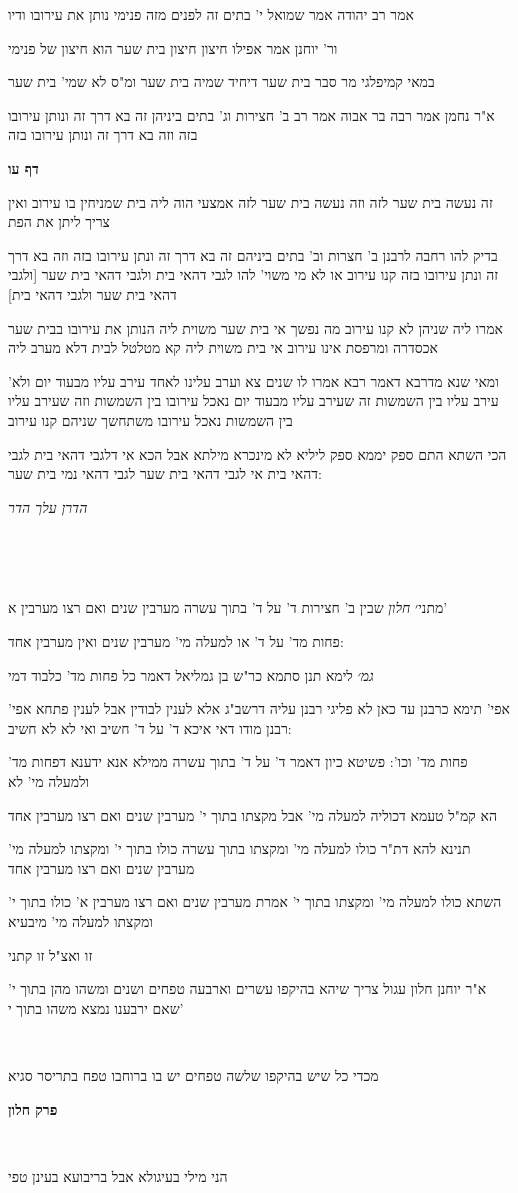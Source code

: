 \documentclass[12pt, openany]{book}
\newcommand{\sethebfont}{
\fontsize{10.5pt}{21.0pt} \selectfont
}
\newcommand{\textblock}[1]{
{\sethebfont #1\\}	
}
\newcommand{\chapname}{}
\newcommand{\sectname}{}
\newcommand{\newchap}[1]{
	\addcontentsline{toc}{chapter}{#1}
	\renewcommand{\chapname}{#1}
		\begin{center}
			\textbf{%
\fontsize{16pt}{16pt}\selectfont
				#1}
		\end{center}
}
\newcommand{\newsection}[1]{
	\addcontentsline{toc}{section}{#1}
	\renewcommand{\sectname}{#1}	
	\vspace{-\baselineskip}
	\begin{center}
		\textbf{%
\fontsize{16pt}{16pt}\selectfont
			#1}
	\end{center}
	\vspace{-\baselineskip}
	\nopagebreak
}
\begin{document}
\textblock{אמר רב יהודה אמר שמואל י' בתים זה לפנים מזה פנימי נותן את עירובו ודיו}
\textblock{ור' יוחנן אמר אפילו חיצון חיצון בית שער הוא חיצון של פנימי}
\textblock{במאי קמיפלגי מר סבר בית שער דיחיד שמיה בית שער ומ"ס לא שמי' בית שער}
\textblock{א"ר נחמן אמר רבה בר אבוה אמר רב ב' חצירות וג' בתים ביניהן זה בא דרך זה ונותן עירובו בזה וזה בא דרך זה ונותן עירובו בזה}
\newsection{דף עו}
\textblock{זה נעשה בית שער לזה וזה נעשה בית שער לזה אמצעי הוה ליה בית שמניחין בו עירוב ואין צריך ליתן את הפת}
\textblock{בדיק להו רחבה לרבנן ב' חצרות וב' בתים ביניהם זה בא דרך זה ונתן עירובו בזה וזה בא דרך זה ונתן עירובו בזה קנו עירוב או לא מי משוי' להו לגבי דהאי בית ולגבי דהאי בית שער [ולגבי דהאי בית שער ולגבי דהאי בית]}
\textblock{אמרו ליה שניהן לא קנו עירוב מה נפשך אי בית שער משוית ליה הנותן את עירובו בבית שער אכסדרה ומרפסת אינו עירוב אי בית משוית ליה קא מטלטל לבית דלא מערב ליה}
\textblock{ומאי שנא מדרבא דאמר רבא אמרו לו שנים צא וערב עלינו לאחד עירב עליו מבעוד יום ולא' עירב עליו בין השמשות זה שעירב עליו מבעוד יום נאכל עירובו בין השמשות וזה שעירב עליו בין השמשות נאכל עירובו משתחשך שניהם קנו עירוב}
\textblock{הכי השתא התם ספק יממא ספק ליליא לא מינכרא מילתא אבל הכא אי דלגבי דהאי בית לגבי דהאי בית אי לגבי דהאי בית שער לגבי דהאי נמי בית שער:}
\textblock{\par \par {\large\emph{הדרן עלך הדר}}\par \par }
\textblock{}
\textblock{מתני׳ {\large\emph{חלון}} שבין ב' חצירות ד' על ד' בתוך עשרה מערבין שנים ואם רצו מערבין א'}
\textblock{פחות מד' על ד' או למעלה מי' מערבין שנים ואין מערבין אחד:}
\textblock{{\large\emph{גמ׳}} לימא תנן סתמא כר"ש בן גמליאל דאמר כל פחות מד' כלבוד דמי}
\textblock{אפי' תימא כרבנן עד כאן לא פליגי רבנן עליה דרשב"ג אלא לענין לבודין אבל לענין פתחא אפי' רבנן מודו דאי איכא ד' על ד' חשיב ואי לא לא חשיב:}
\textblock{פחות מד' וכו': פשיטא כיון דאמר ד' על ד' בתוך עשרה ממילא אנא ידענא דפחות מד' ולמעלה מי' לא}
\textblock{הא קמ"ל טעמא דכוליה למעלה מי' אבל מקצתו בתוך י' מערבין שנים ואם רצו מערבין אחד}
\textblock{תנינא להא דת"ר כולו למעלה מי' ומקצתו בתוך עשרה כולו בתוך י' ומקצתו למעלה מי' מערבין שנים ואם רצו מערבין אחד}
\textblock{השתא כולו למעלה מי' ומקצתו בתוך י' אמרת מערבין שנים ואם רצו מערבין א' כולו בתוך י' ומקצתו למעלה מי' מיבעיא}
\textblock{זו ואצ"ל זו קתני}
\textblock{א"ר יוחנן חלון עגול צריך שיהא בהיקפו עשרים וארבעה טפחים ושנים ומשהו מהן בתוך י' שאם ירבענו נמצא משהו בתוך י'}
\textblock{}
\textblock{מכדי כל שיש בהיקפו שלשה טפחים יש בו ברוחבו טפח בתריסר סגיא}
\newchap{פרק \quad חלון}
\textblock{}
\textblock{הני מילי בעיגולא אבל בריבועא בעינן טפי}
\end{document}
